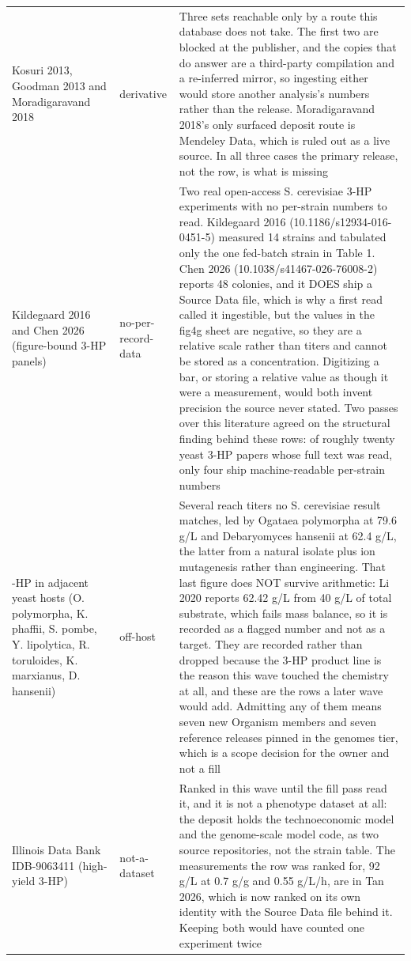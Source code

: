 \begin{longtable}{@{}L{58mm} L{26mm} L{88mm}@{}}
\addlinespace[5pt]
Kosuri 2013, Goodman 2013 and Moradigaravand 2018 & derivative & Three sets reachable only by a route this database does not take. The first two are blocked at the publisher, and the copies that do answer are a third-party compilation and a re-inferred mirror, so ingesting either would store another analysis's numbers rather than the release. Moradigaravand 2018's only surfaced deposit route is Mendeley Data, which is ruled out as a live source. In all three cases the primary release, not the row, is what is missing \\
\addlinespace[5pt]
Kildegaard 2016 and Chen 2026 (figure-bound 3-HP panels) & no-per-record-data & Two real open-access S. cerevisiae 3-HP experiments with no per-strain numbers to read. Kildegaard 2016 (10.1186/s12934-016-0451-5) measured 14 strains and tabulated only the one fed-batch strain in Table 1. Chen 2026 (10.1038/s41467-026-76008-2) reports 48 colonies, and it DOES ship a Source Data file, which is why a first read called it ingestible, but the values in the fig4g sheet are negative, so they are a relative scale rather than titers and cannot be stored as a concentration. Digitizing a bar, or storing a relative value as though it were a measurement, would both invent precision the source never stated. Two passes over this literature agreed on the structural finding behind these rows: of roughly twenty yeast 3-HP papers whose full text was read, only four ship machine-readable per-strain numbers \\
-HP in adjacent yeast hosts (O. polymorpha, K. phaffii, S. pombe, Y. lipolytica, R. toruloides, K. marxianus, D. hansenii) & off-host & Several reach titers no S. cerevisiae result matches, led by Ogataea polymorpha at 79.6 g/L and Debaryomyces hansenii at 62.4 g/L, the latter from a natural isolate plus ion mutagenesis rather than engineering. That last figure does NOT survive arithmetic: Li 2020 reports 62.42 g/L from 40 g/L of total substrate, which fails mass balance, so it is recorded as a flagged number and not as a target. They are recorded rather than dropped because the 3-HP product line is the reason this wave touched the chemistry at all, and these are the rows a later wave would add. Admitting any of them means seven new Organism members and seven reference releases pinned in the genomes tier, which is a scope decision for the owner and not a fill \\
\addlinespace[5pt]
Illinois Data Bank IDB-9063411 (high-yield 3-HP) & not-a-dataset & Ranked in this wave until the fill pass read it, and it is not a phenotype dataset at all: the deposit holds the technoeconomic model and the genome-scale model code, as two source repositories, not the strain table. The measurements the row was ranked for, 92 g/L at 0.7 g/g and 0.55 g/L/h, are in Tan 2026, which is now ranked on its own identity with the Source Data file behind it. Keeping both would have counted one experiment twice \\

\end{longtable}
